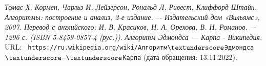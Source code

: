 \begin{thebibliography}{99}
{\itshape Томас Х. Кормен, Чарльз И. Лейзерсон, Рональд Л. Ривест, Клиффорд Штайн.
Алгоритмы: построение и анализ, 2-е издание. –- Издательский дом
«Вильямс», 2007. Перевод с английского: И. В. Красиков, Н. А. Орехова,
В. Н. Романов. –- 1296 с. (ISBN 5-8459-0857-4 (рус.))}.
{\itshape Алгоритм Эдмондса — Карпа - Википедия.} \\URL: \texttt{
https://ru.wikipedia.org/wiki/Алгоритм$\textunderscore$Эдмондса$\textunderscore$—$\textunderscore$Карпа} (дата обращения: 13.11.2022).
\end{thebibliography}
\pagebreak


